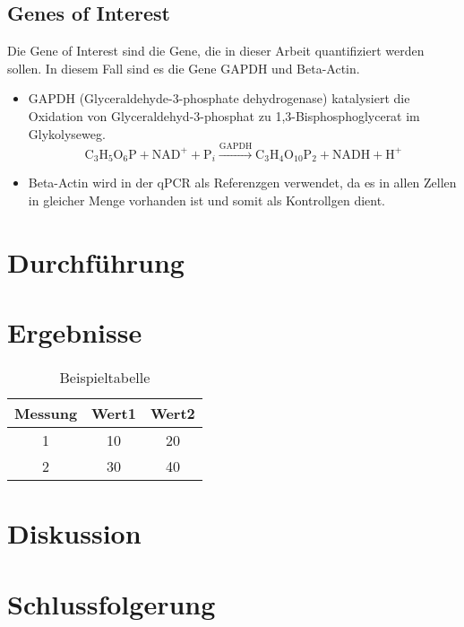 \documentclass{article}
\begin{document}
\subsection*{Genes of Interest}
Die Gene of Interest sind die Gene, die in dieser Arbeit quantifiziert
werden sollen. In diesem Fall sind es die Gene GAPDH und Beta-Actin.
\begin{itemize}
    \item GAPDH (Glyceraldehyde-3-phosphate dehydrogenase) katalysiert die 
    Oxidation von Glyceraldehyd-3-phosphat zu
    1,3-Bisphosphoglycerat im Glykolyseweg.
\[
\text{C}_3\text{H}_5\text{O}_6\text{P} + \text{NAD}^+ + \text{P}_i \xrightarrow{\text{GAPDH}} \text{C}_3\text{H}_4\text{O}_{10}\text{P}_2 + \text{NADH} + \text{H}^+
\]

    \item Beta-Actin wird in der qPCR als Referenzgen verwendet, da es in allen
    Zellen in gleicher Menge vorhanden ist und somit als Kontrollgen dient.
    
\end{itemize}



\section{Durchführung}

\section{Ergebnisse}

\begin{table}[H]
    \centering
    \begin{tabular}{|c|c|c|}
    \hline
    Messung & Wert1 & Wert2 \\
    \hline
    1 & 10 & 20 \\
    2 & 30 & 40 \\
    \hline
    \end{tabular}
    \caption{Beispieltabelle}
    \label{tab:beispiel}
\end{table}


\section{Diskussion}

\section{Schlussfolgerung}



\end{document}
